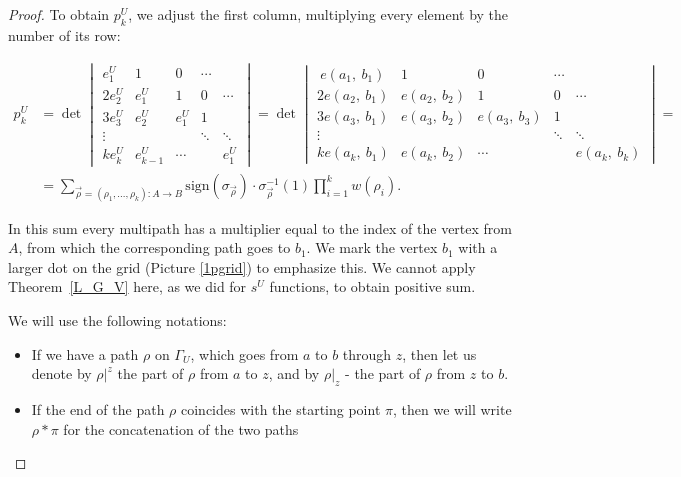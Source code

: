 \documentclass{article}
\theoremstyle{plain}
\theoremstyle{definition}
\begin{document}
\begin{proof}
To  obtain $p^U_k$, we adjust the first column, multiplying every element by the number of its row:

\begin{align}
p^U_k & = \det\begin{vmatrix}
    e^U_1    & 1         & 0      & \cdots          \\
    2e^U_2   & e^U_1       & 1      & 0      & \cdots \\
    3e^U_3   & e^U_2       & e^U_1    & 1               \\
    \vdots &           &        & \ddots & \ddots \\
    ke^U_k   & e^U_{k - 1} & \cdots &        & e^U_1
  \end{vmatrix}=\det\begin{vmatrix}
    \ e( a_1,\ b_1)    & 1         & 0      & \cdots          \\
    2e( a_2,\ b_1)  & e( a_2,\ b_2)        & 1      & 0      & \cdots \\
    3e( a_3,\ b_1)   & e( a_3,\ b_2)       & e( a_3,\ b_3)    & 1               \\
    \vdots &           &        & \ddots & \ddots \\
    ke( a_k,\ b_1)   & e( a_k,\ b_2) & \cdots &        & e( a_k,\ b_k) \end{vmatrix}=\\&\label{mainPG} =\sum\limits_{\vec{\rho}=(\rho_1,...,\rho_k):A\rightarrow B}\mathrm{sign}(\sigma_{\vec{\rho}})\cdot\sigma_{\vec{\rho}}^{-1}(1)\prod\limits_{i=1}^k w(\rho_i).
\end{align}

In this sum every multipath has a multiplier equal to the index of the vertex from $A$, from which the corresponding path goes to $b_1$. We mark the vertex $b_1$ with a larger dot on the grid (Picture \ref{1pgrid}) to emphasize this. We cannot apply Theorem~\ref{L_G_V} here, as we did for $s^U$ functions, to obtain positive sum.

\bigskip
We will use the following notations:
\begin{itemize}
\item If we have a path $\rho$ on $\Gamma_U$, which goes from $a$ to $b$
through $z$, then let us denote by $\rho|^z$ the part of $\rho$ from
$a$ to $z$, and by $\rho|_z$ - the part of $\rho$ from $z$ to $b$.

\item If the end of the path $\rho$ coincides with the starting point
$\pi$, then we will write $\rho*\pi$ for the concatenation
of the two paths


\end{itemize}
\end{proof}
\end{document}
